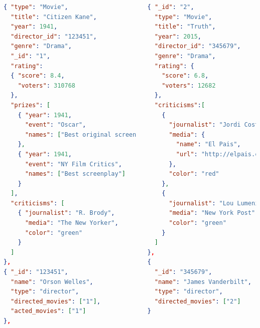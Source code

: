 \documentclass[14pt]{beamer}
\begin{document}
\begin{frame}[fragile]
  \vspace{-0.65cm}
  \begin{columns}
    \begin{lstlisting}[language=json,basicstyle=\tiny\tt]
{ "type": "Movie",
  "title": "Citizen Kane",
  "year": 1941,
  "director_id": "123451",
  "genre": "Drama",
  "_id": "1",
  "rating":
  { "score": 8.4,
    "voters": 310768
  },
  "prizes": [
    { "year": 1941,
      "event": "Oscar",
      "names": ["Best original screenplay"]
    },
    { "year": 1941,
      "event": "NY Film Critics",
      "names": ["Best screenplay"]
    }
  ],
  "criticisms": [
    { "journalist": "R. Brody",
      "media": "The New Yorker",
      "color": "green"
    }
  ]
},
{ "_id": "123451",
  "name": "Orson Welles",
  "type": "director",
  "directed_movies": ["1"],
  "acted_movies": ["1"]
},
    \end{lstlisting}
    \begin{lstlisting}[language=json,basicstyle=\tiny\tt]
{ "_id": "2",
  "type": "Movie",
  "title": "Truth",
  "year": 2015,
  "director_id": "345679",
  "genre": "Drama",
  "rating": {
    "score": 6.8,
    "voters": 12682
  },
  "criticisms":[
    {
      "journalist": "Jordi Costa",
      "media": {
        "name": "El Pais",
        "url": "http://elpais.com/"
      },
      "color": "red"
    },
    {
      "journalist": "Lou Lumenick",
      "media": "New York Post",
      "color": "green"
    }
  ]
},
{
  "_id": "345679",
  "name": "James Vanderbilt",
  "type": "director",
  "directed_movies": ["2"]
}
    \end{lstlisting}
  \end{columns}
\end{frame}
\end{document}
